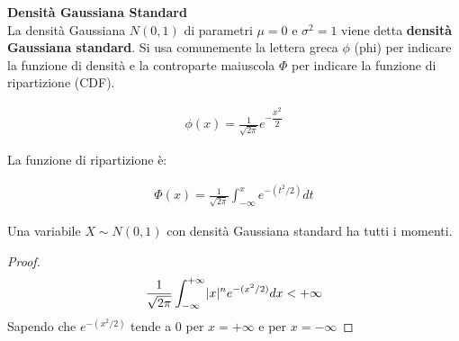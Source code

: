 \begin{defn}
    \textbf{Densità Gaussiana Standard} \\
    La densità Gaussiana $N(0,1)$ di
    parametri $\mu = 0$ e $\sigma^2 = 1$ viene detta \textbf{densità Gaussiana
    standard}. Si usa comunemente la lettera greca $\phi$ (phi) per indicare la
    funzione di densità e la controparte maiuscola $\Phi$ per indicare la funzione di ripartizione (CDF).

    \begin{equation*}
        \begin{aligned}
            \phi(x) = \frac{1}{\sqrt{2 \pi}} e^{-\dfrac{x^2}{2}}
        \end{aligned}
    \end{equation*}

    La funzione di ripartizione è:

    \begin{equation*}
        \begin{aligned}
            \Phi(x) = \frac{1}{\sqrt{2 \pi}} \int_{-\infty}^{x} e^{-(t^2/2)} dt
        \end{aligned}
    \end{equation*}

    \begin{prop}
        Una variabile $X \sim N(0,1)$ con densità Gaussiana standard ha tutti i
        momenti.
    \end{prop}

    \begin{proof}
        \begin{equation*}
            \begin{aligned}
                \frac{1}{\sqrt{2 \pi}} \int_{-\infty}^{+\infty} \lvert x\rvert^n e^{-(x^2/2)} dx < +\infty
            \end{aligned}
        \end{equation*}
        Sapendo che $e^{-(x^2/2)}$ tende a 0 per $x = +\infty$ e per $x = -\infty$
    \end{proof}
\end{defn}

